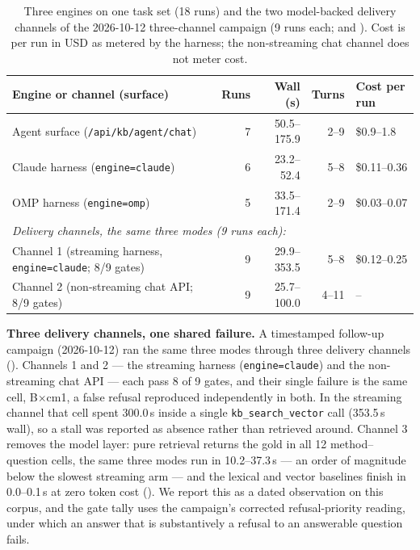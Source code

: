 \begin{table}[!htbp]
\centering
\small
\setlength{\tabcolsep}{4pt}
\caption{Three engines on one task set (18 runs) and the two model-backed
delivery channels of the 2026-10-12 three-channel campaign (9 runs each;
\protect{} and
\protect{}).
Cost is per run in USD as metered by the harness; the non-streaming chat
channel does not meter cost.}
\label{tab:e5-cost}
\begin{tabular}{p{4.4cm}rrrp{2.4cm}}
\toprule
Engine or channel (surface) & Runs & Wall (s) & Turns & Cost per run \\
\midrule
Agent surface (\texttt{/api/kb/agent/chat}) & 7 & 50.5--175.9 & 2--9 & \$0.9--1.8 \\
Claude harness (\texttt{engine=claude}) & 6 & 23.2--52.4 & 5--8 & \$0.11--0.36 \\
OMP harness (\texttt{engine=omp}) & 5 & 33.5--171.4 & 2--9 & \$0.03--0.07 \\
\midrule
\multicolumn{5}{l}{\emph{Delivery channels, the same three modes (9 runs each):}}\\
Channel 1 (streaming harness, \texttt{engine=claude}; 8/9 gates) & 9 & 29.9--353.5 & 5--8 & \$0.12--0.25 \\
Channel 2 (non-streaming chat API; 8/9 gates) & 9 & 25.7--100.0 & 4--11 & -- \\
\bottomrule
\end{tabular}
\end{table}

\textbf{Three delivery channels, one shared failure.}
A timestamped follow-up campaign (2026-10-12) ran the same three modes
through three delivery channels
(). Channels 1 and 2 --- the
streaming harness (\texttt{engine=claude}) and the non-streaming chat API ---
each pass 8 of 9 gates, and their single failure is the same cell, B$\times$cm1,
a false refusal reproduced independently in both. In the streaming channel
that cell spent 300.0\,s inside a single \texttt{kb\_search\_vector} call
(353.5\,s wall), so a stall was reported as absence rather than retrieved
around. Channel 3 removes the model layer: pure retrieval returns the gold in
all 12 method--question cells, the same three modes run in 10.2--37.3\,s ---
an order of magnitude below the slowest streaming arm --- and the lexical and
vector baselines finish in 0.0--0.1\,s at zero token cost
().
We report this as a dated observation on this corpus, and the gate tally uses
the campaign's corrected refusal-priority reading, under which an answer that
is substantively a refusal to an answerable question fails.

